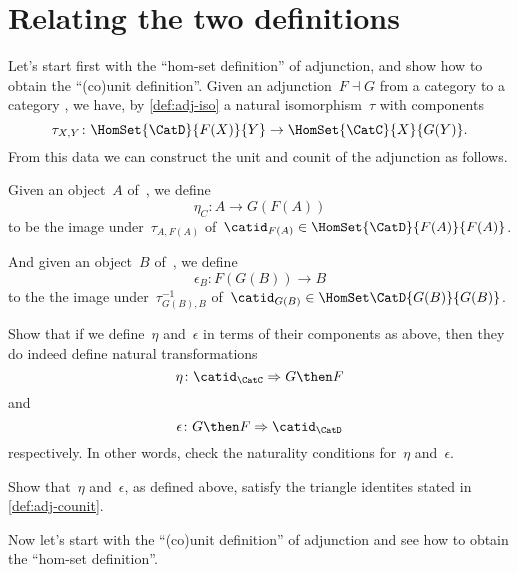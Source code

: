 \section{Relating the two definitions}
\label{relate-adj-defs}

Let's start first with the ``hom-set definition'' of adjunction, and show how to obtain the ``(co)unit definition''.
Given an adjunction~$F \dashv G$ from a category \CatC to a category \CatD, we have, by \cref{def:adj-iso} a natural isomorphism~$\tau$ with components
\begin{equation*}
  \tau_{X,Y} \colon \HomSet{\CatD}{F(X)}{Y} \to \HomSet{\CatC}{X}{G(Y)}.
\end{equation*}
From this data we can construct the unit and counit of the adjunction as follows.

Given an object~$A$ of~\CatC, we define
\begin{equation*}
  \eta_C \colon A \to G(F(A))
\end{equation*}
to be the image under~$\tau_{A, F(A)}$ of~$\catid_{F(A)} \in \HomSet{\CatD}{F (A)}{F(A)}$.

And given an object~$B$ of~\CatD, we define
\begin{equation*}
  \epsilon_B \colon F(G(B)) \to B
\end{equation*}
to the the image under~$\tau_{G(B), B}^{-1}$ of~$\catid_{G(B)} \in \HomSet\CatD{G(B)}{G(B)}$.

\begin{exercise}
  Show that if we define~$\eta$ and~$\epsilon$ in terms of their components as above, then they do indeed define natural transformations
  \begin{equation*}
    \eta\colon \catid_{\CatC} \Rightarrow G\then F
  \end{equation*}
  and
  \begin{equation*}
    \epsilon\colon G \then F \Rightarrow \catid_{\CatD}
  \end{equation*}
  respectively. In other words, check the naturality conditions for~$\eta$ and~$\epsilon$.
\end{exercise}

\begin{exercise}
  Show that~$\eta$ and~$\epsilon$, as defined above, satisfy the triangle identites stated in \cref{def:adj-counit}.
\end{exercise}

Now let's start with the ``(co)unit definition'' of adjunction and see how to obtain the ``hom-set definition''.

